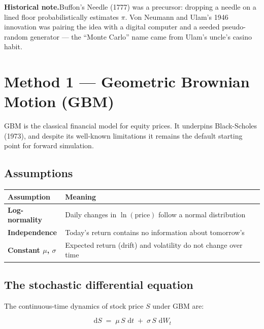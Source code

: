 \documentclass[11pt, a4paper]{article}
\newcommand{\dd}{\,\mathrm{d}}
\begin{document}
\begin{tcolorbox}[warnbox]
\textbf{Historical note.}\quad Buffon's Needle (1777) was a precursor: dropping a needle on a lined floor probabilistically estimates $\pi$. Von Neumann and Ulam's 1946 innovation was pairing the idea with a digital computer and a seeded pseudo-random generator — the ``Monte Carlo'' name came from Ulam's uncle's casino habit.
\end{tcolorbox}

\section{Method 1 — Geometric Brownian Motion (GBM)}
\label{sec:gbm}

GBM is the classical financial model for equity prices. It underpins Black-Scholes (1973), and despite its well-known limitations it remains the default starting point for forward simulation.

\subsection*{Assumptions}

\begin{center}
\begin{tabular}{>{\bfseries}p{4.5cm} p{9.5cm}}
  \toprule
  Assumption & Meaning \\
  \midrule
  Log-normality & Daily changes in $\ln(\text{price})$ follow a normal distribution \\
  Independence & Today's return contains no information about tomorrow's \\
  Constant $\mu$, $\sigma$ & Expected return (drift) and volatility do not change over time \\
  \bottomrule
\end{tabular}
\end{center}

\subsection*{The stochastic differential equation}

The continuous-time dynamics of stock price $S$ under GBM are:

\begin{tcolorbox}[mathbox]
\[
  \dd S \;=\; \mu\, S\, \dd t \;+\; \sigma\, S\, \dd W_t
\]
\end{tcolorbox}
\end{document}
